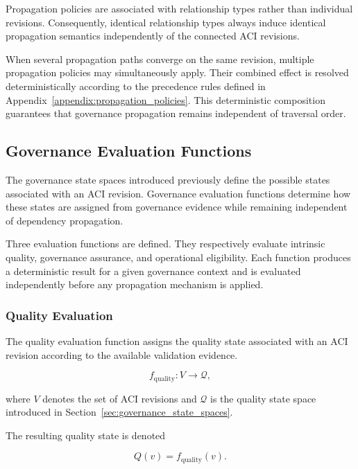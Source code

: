 \documentclass[10pt]{article}
\begin{document}
Propagation policies are associated with relationship types rather than individual revisions. Consequently, identical relationship types always induce identical propagation semantics independently of the connected ACI revisions.

When several propagation paths converge on the same revision, multiple propagation policies may simultaneously apply. Their combined effect is resolved deterministically according to the precedence rules defined in Appendix~\ref{appendix:propagation_policies}. This deterministic composition guarantees that governance propagation remains independent of traversal order.

\subsection{Governance Evaluation Functions}
\label{sec:evaluation_functions}

The governance state spaces introduced previously define the possible states associated with an ACI revision. Governance evaluation functions determine how these states are assigned from governance evidence while remaining independent of dependency propagation.

Three evaluation functions are defined. They respectively evaluate intrinsic quality, governance assurance, and operational eligibility. Each function produces a deterministic result for a given governance context and is evaluated independently before any propagation mechanism is applied.

\subsubsection{Quality Evaluation}

The quality evaluation function assigns the quality state associated with an ACI revision according to the available validation evidence.

\begin{equation}
	f_{\mathrm{quality}} : V \rightarrow \mathcal{Q},
	\label{eq:f_quality}
\end{equation}

where $V$ denotes the set of ACI revisions and $\mathcal{Q}$ is the quality state space introduced in Section~\ref{sec:governance_state_spaces}.

The resulting quality state is denoted

\begin{equation}
	Q(v)=f_{\mathrm{quality}}(v).
	\label{eq:quality_assignment}
\end{equation}
\end{document}
